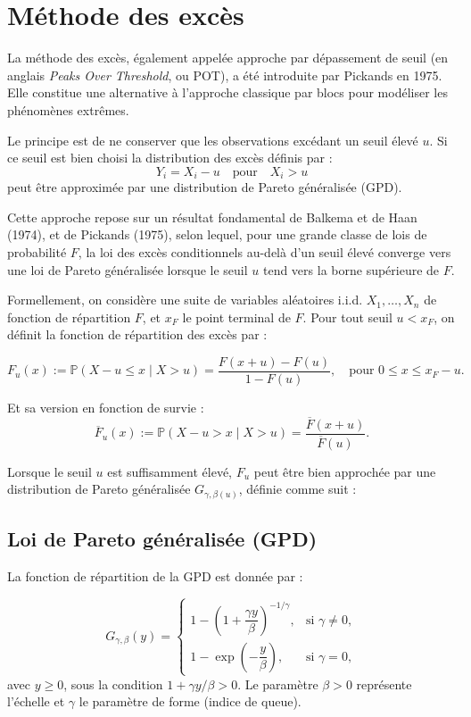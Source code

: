 \documentclass{article}
\theoremstyle{plain}
\theoremstyle{definition}
\theoremstyle{plain}
\begin{document}
\section{Méthode des excès}

La méthode des excès, également appelée approche par dépassement de seuil (en anglais \textit{Peaks Over Threshold}, ou POT), a été introduite par Pickands en 1975. Elle constitue une alternative à l’approche classique par blocs pour modéliser les phénomènes extrêmes.

Le principe est de ne conserver que les observations excédant un seuil élevé \( u \). Si ce seuil est bien choisi la distribution des excès définis par :
\[
Y_i = X_i - u \quad \text{pour} \quad X_i > u
\]
peut être approximée par une distribution de Pareto généralisée (GPD).

\medskip
Cette approche repose sur un résultat fondamental de Balkema et de Haan (1974), et de Pickands (1975), selon lequel, pour une grande classe de lois de probabilité \(F\), la loi des excès conditionnels au-delà d’un seuil élevé converge vers une loi de Pareto généralisée lorsque le seuil \(u\) tend vers la borne supérieure de \(F\).

\medskip
Formellement, on considère une suite de variables aléatoires i.i.d. \(X_1, \dots, X_n\) de fonction de répartition \(F\), et \(x_F\) le point terminal de \(F\). Pour tout seuil \(u < x_F\), on définit la fonction de répartition des excès par :

\[
F_u(x) := \mathbb{P}(X - u \leq x \mid X > u) = \frac{F(x + u) - F(u)}{1 - F(u)},
\quad \text{pour } 0 \leq x \leq x_F - u.
\]

Et sa version en fonction de survie :
\[
\overline{F}_u(x) := \mathbb{P}(X - u > x \mid X > u) = \frac{\overline{F}(x + u)}{\overline{F}(u)}.
\]

Lorsque le seuil \(u\) est suffisamment élevé, \(F_u\) peut être bien approchée par une distribution de Pareto généralisée \(G_{\gamma, \beta(u)}\), définie comme suit :

\subsection{Loi de Pareto généralisée (GPD)}

La fonction de répartition de la GPD est donnée par :

\[
G_{\gamma, \beta}(y) =
\begin{cases}
1 - \left(1 + \dfrac{\gamma y}{\beta}\right)^{-1/\gamma}, & \text{si } \gamma \neq 0, \\
1 - \exp\left(-\dfrac{y}{\beta}\right), & \text{si } \gamma = 0,
\end{cases}
\]
avec \( y \geq 0 \), sous la condition \(1 + \gamma y/\beta > 0\). Le paramètre \(\beta > 0\) représente l’échelle et \(\gamma\) le paramètre de forme (indice de queue).
\end{document}
